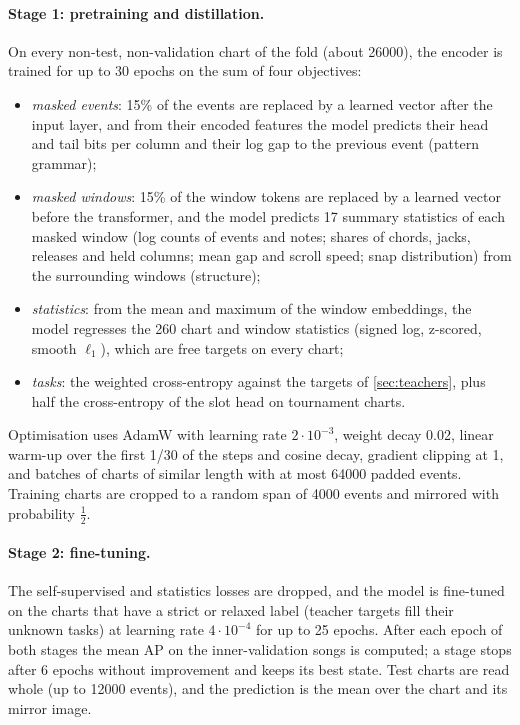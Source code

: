 \documentclass[10pt,twocolumn]{article}
\begin{document}
\paragraph{Stage 1: pretraining and distillation.} On every non-test, non-validation chart of the fold (about \num{26000}), the encoder is trained for up to 30 epochs on the sum of four objectives:
\begin{itemize}\setlength\itemsep{1pt}
\item \emph{masked events}: 15\% of the events are replaced by a learned vector after the input layer, and from their encoded features the model predicts their head and tail bits per column and their log gap to the previous event (pattern grammar);
\item \emph{masked windows}: 15\% of the window tokens are replaced by a learned vector before the transformer, and the model predicts 17 summary statistics of each masked window (log counts of events and notes; shares of chords, jacks, releases and held columns; mean gap and scroll speed; snap distribution) from the surrounding windows (structure);
\item \emph{statistics}: from the mean and maximum of the window embeddings, the model regresses the 260 chart and window statistics (signed log, z-scored, smooth $\ell_1$), which are free targets on every chart;
\item \emph{tasks}: the weighted cross-entropy against the targets of \cref{sec:teachers}, plus half the cross-entropy of the slot head on tournament charts.
\end{itemize}
Optimisation uses AdamW with learning rate $2\cdot10^{-3}$, weight decay 0.02, linear warm-up over the first 1/30 of the steps and cosine decay, gradient clipping at 1, and batches of charts of similar length with at most \num{64000} padded events. Training charts are cropped to a random span of \num{4000} events and mirrored with probability $\tfrac12$.

\paragraph{Stage 2: fine-tuning.} The self-supervised and statistics losses are dropped, and the model is fine-tuned on the charts that have a strict or relaxed label (teacher targets fill their unknown tasks) at learning rate $4\cdot10^{-4}$ for up to 25 epochs. After each epoch of both stages the mean AP on the inner-validation songs is computed; a stage stops after 6 epochs without improvement and keeps its best state. Test charts are read whole (up to \num{12000} events), and the prediction is the mean over the chart and its mirror image.
\end{document}
